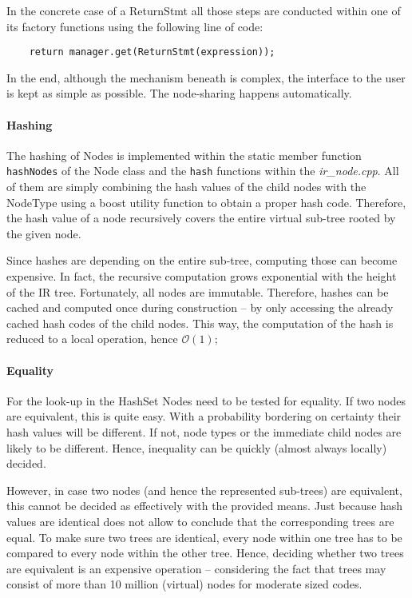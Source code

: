 In the concrete case of a ReturnStmt all those steps are conducted within one of
its factory functions using the following line of code:
\begin{lstlisting}
	return manager.get(ReturnStmt(expression));
\end{lstlisting}

In the end, although the mechanism beneath is complex, the interface to the user
is kept as simple as possible. The node-sharing happens automatically.

\paragraph{Hashing} 
The hashing of Nodes is implemented within the static member function
\lstinline|hashNodes| of the Node class and the \lstinline|hash| functions
within the \textit{ir\_node.cpp}. All of them are simply combining the hash
values of the child nodes with the NodeType using a boost utility function to
obtain a proper hash code. Therefore, the hash value of a node recursively
covers the entire virtual sub-tree rooted by the given node.

Since hashes are depending on the entire sub-tree, computing those can become
expensive. In fact, the recursive computation grows exponential with the height
of the IR tree. Fortunately, all nodes are immutable. Therefore, hashes can be
cached and computed once during construction -- by only accessing the already
cached hash codes of the child nodes. This way, the computation of the hash is
reduced to a local operation, hence $\mathcal{O}(1)$;

\paragraph{Equality}  
For the look-up in the HashSet Nodes need to be tested for equality. If two
nodes are equivalent, this is quite easy. With a probability bordering on
certainty their hash values will be different. If not, node types or the
immediate child nodes are likely to be different. Hence, inequality can be
quickly (almost always locally) decided.

However, in case two nodes (and hence the represented sub-trees) are equivalent,
this cannot be decided as effectively with the provided means. Just because hash
values are identical does not allow to conclude that the corresponding trees are
equal. To make sure two trees are identical, every node within one tree has to
be compared to every node within the other tree. Hence, deciding whether two
trees are equivalent is an expensive operation -- considering the fact that
trees may consist of more than 10 million (virtual) nodes for moderate sized
codes.

